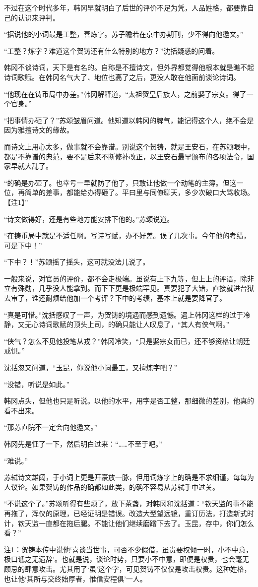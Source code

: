 不过在这个时代多年，韩冈早就明白了后世的评价不足为凭，人品姓格，都要靠自己的认识来评判。

“据说他的小词最是工整，善炼字。苏子瞻若在京中办期刊，少不得向他邀文。”

“工整？炼字？难道这个贺铸还有什么特别的地方？”沈括疑惑的问着。

韩冈不谈诗词，天下是有名的。自称是不擅诗文，但外界都觉得他根本就是瞧不起诗词歌赋。在韩冈名气大了、地位也高了之后，更没人敢在他面前谈论诗词。

“他现在在铸币局中办差。”韩冈解释道，“太祖贺皇后族人，之前娶了宗女。得了一个官身。”

“把事情办砸了？”苏颂皱眉问道。他知道以韩冈的脾气，能记得这个人，绝不会是因为雅擅诗文的缘故。

而诗文上用心太多，做事就不会靠谱。别说这个贺铸，就是王安石，在苏颂眼中，都是不靠谱的典范，要不是后来不断修补改正，以王安石最早颁布的各项法令，国家早就大乱了。

“的确是办砸了。也幸亏一早就防了他了，只敢让他做一个动笔的主簿。但这一位，再简单的差事，都能给办得砸了。平曰里与同僚聊天，多少次破口大骂收场。【注1】”

“诗文做得好，还是有些地方能安排下他的。”苏颂说道。

“在铸币局中就是不适任啊。写诗写赋，办不好差。误了几次事。今年他的考绩，可是下中！”

“下中？！”苏颂摇了摇头，这可就没法儿说了。

一般来说，对官员的评价，都不会走极端。虽说有上下九等，但上上的评语，除非立有殊勋，几乎没人能拿到。而下下更是极端罕见。真要犯了大错，直接就进台狱去审了，谁还耐烦给他加一个考评？下中的考绩，基本上就是要降官了。

“真是可惜。”沈括感叹了一声，为贺铸的境遇而感到遗憾。遇上韩冈这样的过于冷静，又无心诗词歌赋的顶头上司，的确只能让人叹息了，“其人有侠气啊。”

“侠气？怎么不见他投笔从戎？”韩冈冷笑，“只是娶宗女而已，还不够资格让朝廷戒惧。”

沈括忽又问道，“玉昆，你说他小词最工，又擅炼字吧？”

“没错，听说是如此。”

韩冈点头，但他也只是听说。以他的水平，用字是否工整，那细微的差别，他真的看不出来。

“那苏直院不一定会向他邀文。”

韩冈先是怔了一下，然后明白过来：“……不至于吧。”

“难说。”

苏轼诗文雄阔，于小词上更是开豪放一脉，但用词炼字上的确是不求细谨，每每为人议论。如果贺铸的作品的确都如此类，的确不容易从苏轼手中过关。

“不说这个了。”苏颂听得有些烦了，放下茶盏，对韩冈和沈括道：“钦天监的事不能再拖了，浑仪的原理，已经证明是错误。改造大型望远镜，重订历法，打造新式时计，钦天监一直都在拖后腿。不能让他们继续磨蹭下去了。玉昆，存中，你们怎么看？”

注1：贺铸本传中说他‘喜谈当世事，可否不少假借，虽贵要权倾一时，小不中意，极口诋之无遗辞’。也就是说，谈论时势，只要小不中意，即便是权贵，也会毫无顾忌的肆意攻击。尤其用了‘虽’这个字，可见贺铸不仅仅是攻击权贵。这种姓格，也让他‘其所与交终始厚者，惟信安程俱’一人。

